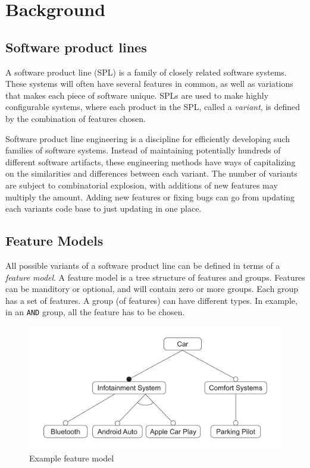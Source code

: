 \documentclass[a4paper,english]{ifimaster}
\begin{document}
\chapter{Background}%
\label{cha:background}

\section{Software product lines}%
\label{sec:software_product_lines}

A software product line (SPL) is a family of closely related software systems. These systems will often have several features in common, as well as variations that makes each piece of software unique. SPLs are used to make highly configurable systems, where each product in the SPL, called a \textit{variant}, is defined by the combination of features chosen.

Software product line engineering is a discipline for efficiently developing such families of software systems. Instead of maintaining potentially hundreds of different software artifacts, these engineering methods have ways of capitalizing on the similarities and differences between each variant. The number of variants are subject to combinatorial explosion, with additions of new features may multiply the amount. Adding new features or fixing bugs can go from updating each variants code base to just updating in one place.

\section{Feature Models}%
\label{sec:feature_models}

All possible variants of a software product line can be defined in terms of a \textit{feature model}. A feature model is a tree structure of features and groups. Features can be manditory or optional, and will contain zero or more groups. Each group has a set of features. A group (of features) can have different types. In example, in an \texttt{AND} group, all the feature has to be chosen.

\begin{figure}[htpb]
	\centering
	\includegraphics[width=0.8\linewidth]{illustrations/example.pdf}
	\caption{Example feature model}%
	\label{fig:example1}
\end{figure}
\end{document}
